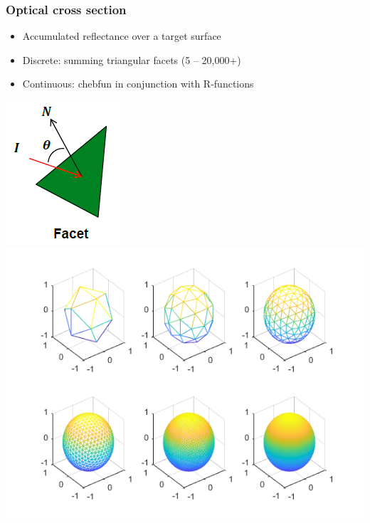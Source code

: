 \documentclass{beamer}
\begin{document}
\begin{frame}[t]
\frametitle{Optical cross section}
\begin{itemize}
\item Accumulated reflectance over a target surface
\item Discrete: summing triangular facets (5 -- 20,000+) 
\item Continuous: chebfun in conjunction with R-functions
\end{itemize}
\centerline{\includegraphics[scale = 0.5]{./figs/facet.png} \: \includegraphics[scale = 0.5]{./figs/icosahedron.png}}
\end{frame}
\end{document}
